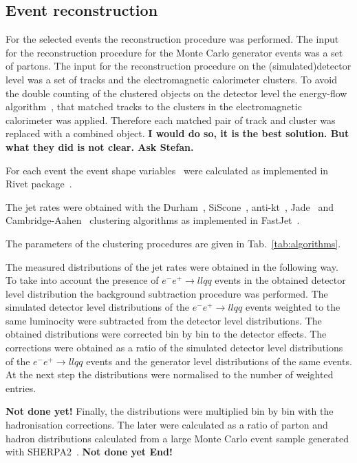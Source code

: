 \subsection{Event reconstruction}
\label{sec:reconstruction}
For the selected events the reconstruction procedure was performed.
The input for the reconstruction procedure for the Monte Carlo generator events
was a set of partons.
The input for the reconstruction procedure on the (simulated)detector level
 was a set of tracks and the electromagnetic calorimeter clusters.
To avoid the double counting of the clustered objects on the detector level the energy-flow 
algorithm~\cite{Ackerstaff:1997nga,Abbiendi:1999sy}, that matched tracks to the 
 clusters in the electromagnetic calorimeter was applied. Therefore each 
 matched pair of track and cluster was replaced with a combined object.
 {\bf I would do so, it is the best solution. But what they did is not clear. Ask Stefan.}

For each event the event shape variables~\cite{OPAL:2011aa} 
were calculated  as  implemented in Rivet package~\cite{Buckley:2010ar}.

The jet rates were obtained with the Durham~\cite{Catani:1991hj}, SiScone~\cite{Cacciari:2005hq}, anti-kt~\cite{Cacciari:2008gp}, Jade~\cite{Bartel:1986ua}
  and Cambridge-Aahen~\cite{Dokshitzer:1997in}
clustering algorithms as implemented in FastJet~\cite{Cacciari:2011ma}.

The parameters of the clustering procedures are given in Tab.~\ref{tab:algorithms}.
\TABalgorithms

The measured distributions of the jet rates were obtained in the following way.
To take into account the presence of $e^-e^+ \rightarrow llqq$ events in the 
obtained detector level distribution the background subtraction procedure was performed.
The simulated detector level distributions of the $e^-e^+ \rightarrow llqq$ events 
weighted to the same luminocity were subtracted from the detector level distributions.
The obtained distributions were corrected bin by bin to the detector effects. 
The corrections were obtained as a ratio of 
the simulated detector level distributions of the $e^-e^+ \rightarrow llqq$ events 
and the generator level distributions of the same events.
At the next step the  distributions were normalised to the number of weighted entries.

{\bf Not done yet!}
Finally, the distributions were  multiplied bin by bin with the hadronisation corrections.
The later were calculated as a ratio of parton and hadron distributions calculated 
from a large Monte Carlo event sample generated with SHERPA2~\cite{Gleisberg:2008ta}.
{\bf Not done yet End!}


